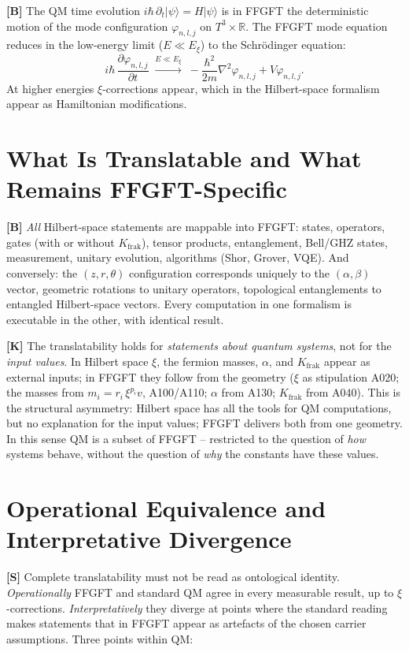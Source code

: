 \textbf{[B]} The QM time evolution $i\hbar\,\partial_t|\psi\rangle = H|\psi\rangle$
is in FFGFT the deterministic motion of the mode configuration $\varphi_{n,l,j}$
on $T^3\times\mathbb{R}$. The FFGFT mode equation reduces in the low-energy limit
($E\ll E_\xi$) to the Schrödinger equation:
\[
  i\hbar\,\frac{\partial\varphi_{n,l,j}}{\partial t}
  \;\xrightarrow{E\ll E_\xi}\;
  -\frac{\hbar^2}{2m}\nabla^2\varphi_{n,l,j} + V\varphi_{n,l,j}.
\]
At higher energies $\xi$-corrections appear, which in the Hilbert-space formalism
appear as Hamiltonian modifications.

\section{What Is Translatable and What Remains FFGFT-Specific}

\textbf{[B]} \emph{All} Hilbert-space statements are mappable into FFGFT: states,
operators, gates (with or without $K_{\text{frak}}$), tensor products,
entanglement, Bell/GHZ states, measurement, unitary evolution, algorithms (Shor,
Grover, VQE). And conversely: the $(z,r,\theta)$ configuration corresponds
uniquely to the $(\alpha,\beta)$ vector, geometric rotations to unitary operators,
topological entanglements to entangled Hilbert-space vectors. Every computation
in one formalism is executable in the other, with identical result.

\textbf{[K]} The translatability holds for \emph{statements about quantum
systems}, not for the \emph{input values}. In Hilbert space $\xi$, the fermion
masses, $\alpha$, and $K_{\text{frak}}$ appear as external inputs; in FFGFT they
follow from the geometry ($\xi$ as stipulation A020; the masses from
$m_i = r_i\,\xi^{p_i}v$, A100/A110; $\alpha$ from A130; $K_{\text{frak}}$ from
A040). This is the structural asymmetry: Hilbert space has all the tools for QM
computations, but no explanation for the input values; FFGFT delivers both from
one geometry. In this sense QM is a subset of FFGFT -- restricted to the question
of \emph{how} systems behave, without the question of \emph{why} the constants
have these values.

\section{Operational Equivalence and Interpretative Divergence}

\textbf{[S]} Complete translatability must not be read as ontological identity.
\emph{Operationally} FFGFT and standard QM agree in every measurable result, up
to $\xi$-corrections. \emph{Interpretatively} they diverge at points where the
standard reading makes statements that in FFGFT appear as artefacts of the chosen
carrier assumptions. Three points within QM:

